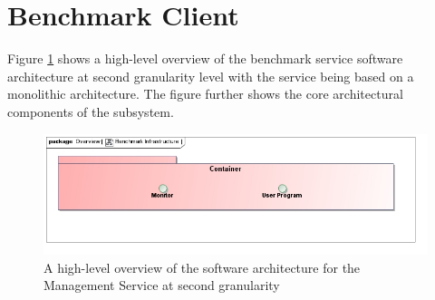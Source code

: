 \section{Benchmark Client}
Figure \ref{fig:benchmarkSoftwareArchitecture} shows a high-level overview of
the benchmark service software architecture at second granularity level with the
service being based on a monolithic architecture. The figure further shows the core
architectural components of the subsystem.
\begin{figure}[H]
  \begin{center}
  \includegraphics[scale=0.4]{../Diagrams and Charts/Overview/BenchmarkInfrastructure.jpg}
  \caption{A high-level overview of the software architecture for the Management Service at second granularity}
  \label{fig:benchmarkSoftwareArchitecture}
  \end{center}
\end{figure}
